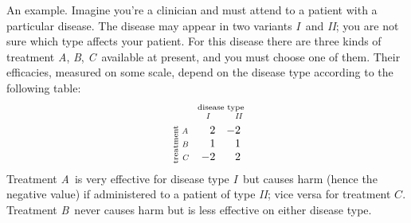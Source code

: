 \documentclass[\ifafour a4paper,12pt,\else a5paper,10pt,\fi%
onecolumn,oneside,article,%
british%
]{memoir}
\theoremstyle{remark}
\theoremstyle{innote}
\renewcommand*{\|}[1][]{\nonscript\:#1\vert\nonscript\:\mathopen{}}
\newcommand*{\tI}{\textit{I}}
\newcommand*{\tII}{\textit{II}}
\newcommand*{\tA}{\textit{A}}
\newcommand*{\tB}{\textit{B}}
\newcommand*{\tC}{\textit{C}}
\begin{document}
An example. Imagine you're a clinician and must attend to a patient with a particular disease. The disease may appear in two variants \tI\ and \tII; you are not sure which type affects your patient. For this disease there are three kinds of treatment \tA, \tB, \tC\ available at present, and you must choose one of them. Their efficacies, measured on some scale, depend on the disease type according to the following table:
\begin{equation*}
  {\text{\rotatebox[origin=c]{90}{\scriptsize treatment}}}\ 
  \begin{matrix} {\scriptsize\tA}\\
    {\scriptsize\tB}\\
    {\scriptsize\tC}
  \end{matrix}\quad
  \overbracket[0pt]{
      \begin{matrix*}[r]
    2 & -2 \\ 1 & 1 \\ -2 & 2
      \end{matrix*}}^{
      \mathclap{\text{\parbox{8em}{\centering\scriptsize disease type\\\hphantom{$-{}$}\tI\hspace{2em}\hphantom{$-{}$}\tII}}
    }}
\end{equation*}
Treatment \tA\ is very effective for disease type \tI\ but causes harm (hence the negative value) if administered to a patient of type \tII; vice versa for treatment $\tC$. Treatment \tB\ never causes harm but is less effective on either disease type.
\end{document}
